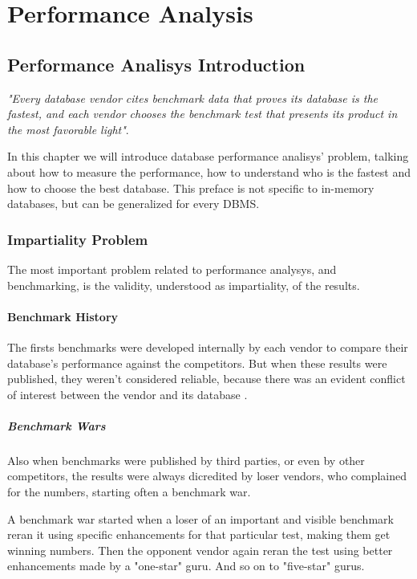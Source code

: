 \part{Performance Analysis}

\chapter{Performance Analisys Introduction}
\emph{"Every database vendor cites benchmark data that proves its database is the fastest, and each vendor chooses the benchmark test that presents its product in the most favorable light"}\cite{burleson}.

In this chapter we will introduce database performance analisys' problem, talking about how to measure the performance, how to understand who is the fastest and how to choose the best database. This preface is not specific to in-memory databases, but can be generalized for every DBMS.
	
	\section{Impartiality Problem}
The most important problem related to performance analysys, and benchmarking, is the validity, understood as impartiality, of the results. 
		
		\subsection{Benchmark History}
The firsts benchmarks were developed internally by each vendor to compare their database's performance against the competitors. But when these results were published, they weren't considered reliable, because there was an evident conflict of interest between the vendor and its database \cite{gray}.
	
		\subsubsection{Benchmark Wars}
Also when benchmarks were published by third parties, or even by other competitors, the results were always dicredited by loser vendors, who complained for the numbers, starting often a benchmark war. 

A benchmark war started when a loser of an important and visible benchmark reran it using specific enhancements for that particular test, making them get winning numbers. Then the opponent vendor again reran the test using better enhancements made by a "one-star" guru. And so on to "five-star" gurus.

